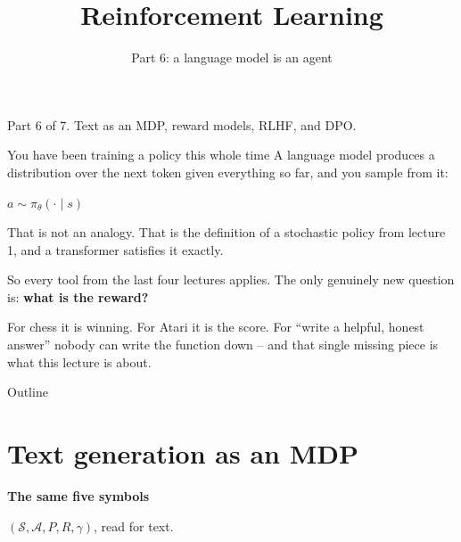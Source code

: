 \documentclass[aspectratio=169]{beamer}
\title{Reinforcement Learning}
\subtitle{Part 6: a language model is an agent}
\author{}
\date{}
\begin{document}
\begin{frame}
  \titlepage
  \begin{center}\scriptsize\color{gray}
    Part 6 of 7. Text as an MDP, reward models, RLHF, and DPO.
  \end{center}
\end{frame}

\begin{frame}{You have been training a policy this whole time}
  \small
  A language model produces a distribution over the next token given everything so far, and you
  sample from it:

  \vskip 6pt
  \begin{center}
  \begin{tcolorbox}[colback=lightbg, colframe=popblue, boxrule=0.7pt, arc=2pt, width=0.66\textwidth]
    \begin{center}
      \large $a \sim \pi_\theta(\cdot \mid s)$
    \end{center}
  \end{tcolorbox}
  \end{center}

  \vskip 8pt
  \begin{center}
    \small
    That is not an analogy. That is the definition of a stochastic policy from lecture 1,
    and a transformer satisfies it exactly.
  \end{center}

  \vskip 10pt
  \begin{tcolorbox}[colback=armorange!12, colframe=armorange, boxrule=0.7pt, arc=2pt]
    \small
    So every tool from the last four lectures applies. The only genuinely new question is:
    \textbf{what is the reward?}

    \vskip 4pt
    For chess it is winning. For Atari it is the score. For ``write a helpful, honest answer''
    nobody can write the function down -- and that single missing piece is what this lecture is
    about.
  \end{tcolorbox}
\end{frame}

\begin{frame}{Outline}
  \tableofcontents
\end{frame}

\section{Text generation as an MDP}
\begin{frame}[plain]
  \begin{center}
    \vskip 1.6cm
    {\Huge\bfseries\color{popblue}The same five symbols}

    \vskip 0.6cm
    {\large $(\mathcal{S}, \mathcal{A}, P, R, \gamma)$, read for text.}
  \end{center}
\end{frame}
\end{document}
